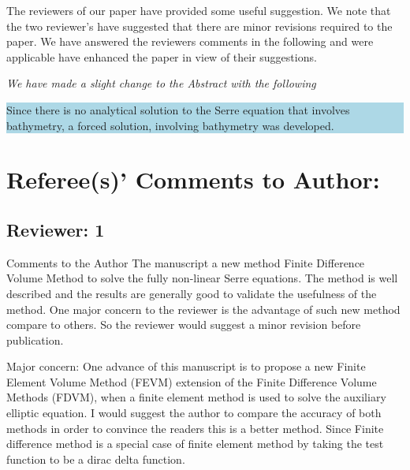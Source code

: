 \documentclass[subeqn]{article}
\newcommand{\hlb}[1] {\par\colorbox{lightblue}{\parbox{\linewidth}{#1}}}
\begin{document}
The reviewers of our paper have provided some useful suggestion. We note that the two reviewer's have suggested that there are minor revisions required to the paper. We have answered the reviewers comments in the following and were applicable have enhanced the paper in view of their suggestions.

\emph{We have made a slight change to the Abstract with the following}
\hlb{Since there is no analytical solution to the Serre equation that involves bathymetry, a forced solution, involving bathymetry was developed.}

\section*{Referee(s)' Comments to Author:}

\subsection*{Reviewer: 1}

Comments to the Author
The manuscript a new method Finite Difference Volume Method to solve the fully non-linear Serre equations. The method is well described and the results are generally good to validate the usefulness of the method. One major concern to the reviewer is the advantage of such new method compare to others. So the reviewer would suggest a minor revision before publication.

Major concern:
One advance of this manuscript is to propose a new Finite Element Volume Method (FEVM) extension of the Finite Difference Volume Methods (FDVM), when a finite element method is used to solve the auxiliary elliptic equation. I would suggest the author to compare the accuracy of both methods in order to convince the readers this is a better method. Since Finite difference method is a special case of finite element method by taking the test function to be a dirac delta function.
\end{document}
